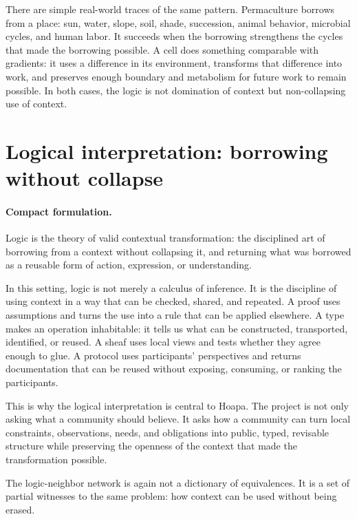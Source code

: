\documentclass[11pt]{article}
\begin{document}
There are simple real-world traces of the same pattern. Permaculture borrows
from a place: sun, water, slope, soil, shade, succession, animal behavior,
microbial cycles, and human labor. It succeeds when the borrowing strengthens
the cycles that made the borrowing possible. A cell does something comparable
with gradients: it uses a difference in its environment, transforms that
difference into work, and preserves enough boundary and metabolism for future
work to remain possible. In both cases, the logic is not domination of context
but non-collapsing use of context.

\section{Logical interpretation: borrowing without collapse}

\paragraph{Compact formulation.}
Logic is the theory of valid contextual transformation: the disciplined art of
borrowing from a context without collapsing it, and returning what was borrowed
as a reusable form of action, expression, or understanding.

In this setting, logic is not merely a calculus of inference. It is the
discipline of using context in a way that can be checked, shared, and repeated.
A proof uses assumptions and turns the use into a rule that can be applied
elsewhere. A type makes an operation inhabitable: it tells us what can be
constructed, transported, identified, or reused. A sheaf uses local views and
tests whether they agree enough to glue. A protocol uses participants'
perspectives and returns documentation that can be reused without exposing,
consuming, or ranking the participants.

This is why the logical interpretation is central to Hoapa. The project is not
only asking what a community should believe. It asks how a community can turn
local constraints, observations, needs, and obligations into public, typed,
revisable structure while preserving the openness of the context that made the
transformation possible.

The logic-neighbor network is again not a dictionary of equivalences. It is a
set of partial witnesses to the same problem: how context can be used without
being erased.
\end{document}
